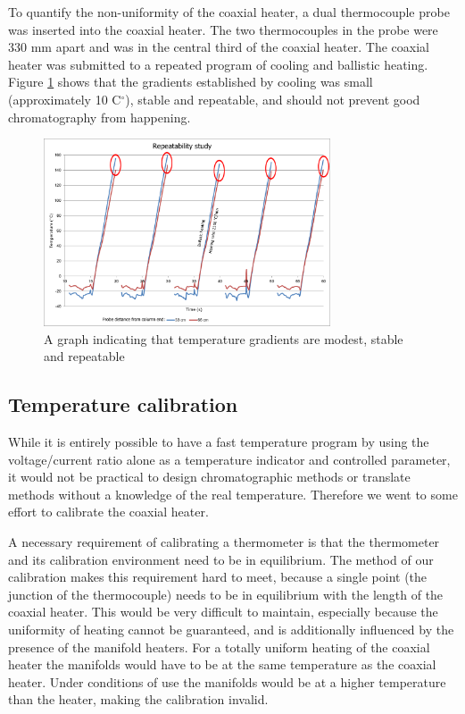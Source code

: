 \documentclass[aip,rsi,preprint,graphicx]{revtex4-1} %
\begin{document}
To quantify the non-uniformity of the coaxial heater, a dual thermocouple probe was inserted into the coaxial heater. The two thermocouples in the probe were 330 mm apart and was in the central third of the coaxial heater. The coaxial heater was submitted to a repeated program of cooling and ballistic heating. Figure \ref{fig:Repeatability} shows that the gradients established by cooling was small (approximately 10 C$^\circ$), stable and repeatable, and should not prevent good chromatography from happening. 

\begin{figure}
\includegraphics[width=8.5cm]{cp}%
\caption{\label{fig:Repeatability}A graph indicating that temperature gradients are modest, stable and repeatable}%
\end{figure}

\subsection{Temperature calibration}

While it is entirely possible to have a fast temperature program by using the voltage/current ratio alone as a temperature indicator and controlled parameter, it would not be practical to design chromatographic methods or translate methods without a knowledge of the real temperature. Therefore we went to some effort to calibrate the coaxial heater. 

A necessary requirement of calibrating a thermometer is that the thermometer and its calibration environment need to be in equilibrium. The method of our calibration makes this requirement hard to meet, because a single point (the junction of the thermocouple) needs to be in equilibrium with the length of the coaxial heater. This would be very difficult to maintain, especially because the uniformity of heating cannot be guaranteed, and is additionally influenced by the presence of the manifold heaters. For a totally uniform heating of the coaxial heater the manifolds would have to be at the same temperature as the coaxial heater. Under conditions of use the manifolds would be at a higher temperature than the heater, making the calibration invalid. 
\end{document}
